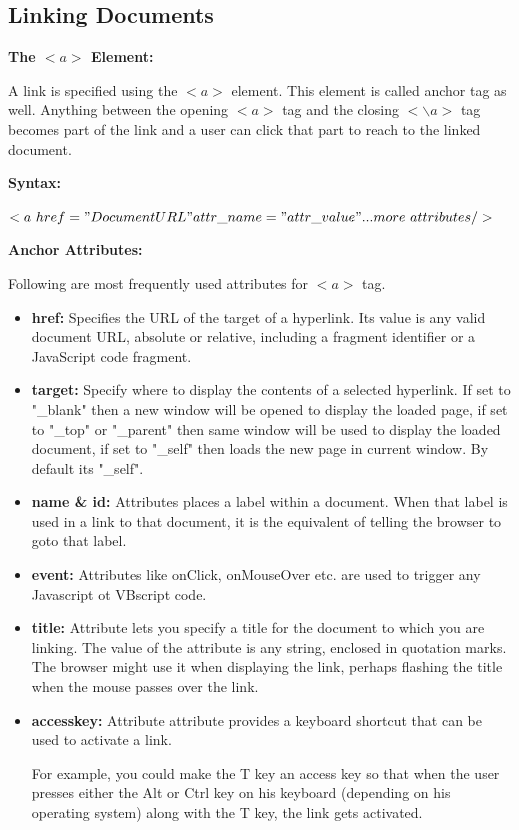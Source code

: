 \documentclass[11pt,a4paper]{article}
\begin{document}
\subsection*{Linking Documents}

\textbf{ The $<a>$ Element:}\

A link is specified using the $<a>$ element. This element is called anchor tag as well. Anything between the opening $<a>$ tag and the closing $<\backslash a>$ tag becomes part of the link and a user can click that part to reach to the linked document.\

\textbf{Syntax:}\

$<a\ href="Document URL" attr\_name="attr\_value"...more\ attributes />$\

\textbf{Anchor Attributes:}\

Following are most frequently used attributes for $<a>$ tag.
\begin{itemize}
\item \textbf{href:} Specifies the URL of the target of a hyperlink. Its value is any valid document URL, absolute or relative, including a fragment identifier or a JavaScript code fragment.
\item \textbf{target:} Specify where to display the contents of a selected hyperlink. If set to "\_blank" then a new window will be opened to display the loaded page, if set to "\_top" or "\_parent" then same window will be used to display the loaded document, if set to "\_self" then loads the new page in current window. By default its "\_self".
\item \textbf{name \& id:} Attributes places a label within a document. When that label is used in a link to that document, it is the equivalent of telling the browser to goto that label.
\item \textbf{event:} Attributes like onClick, onMouseOver etc. are used to trigger any Javascript ot VBscript code.
\item \textbf{title:} Attribute lets you specify a title for the document to which you are linking. The value of the attribute is any string, enclosed in quotation marks. The browser might use it when displaying the link, perhaps flashing the title when the mouse passes over the link.
\item \textbf{accesskey:} Attribute attribute provides a keyboard shortcut that can be used to activate a link.\

For example, you could make the T key an access key so that when the user presses either the Alt or Ctrl key on his keyboard (depending on his operating system) along with the T key, the link gets activated.\
\end{itemize}
\end{document}
